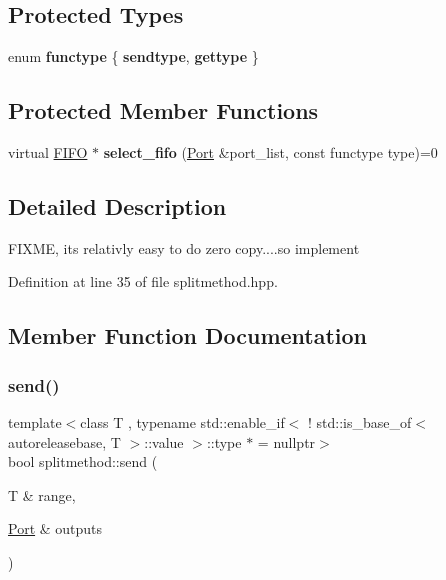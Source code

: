 \subsection*{Protected Types}
\begin{DoxyCompactItemize}
\item 
\hypertarget{classsplitmethod_a55be00e14bebb5a2df32666ca46a1592}{}\label{classsplitmethod_a55be00e14bebb5a2df32666ca46a1592} 
enum {\bfseries functype} \{ {\bfseries sendtype}, 
{\bfseries gettype}
 \}
\end{DoxyCompactItemize}
\subsection*{Protected Member Functions}
\begin{DoxyCompactItemize}
\item 
\hypertarget{classsplitmethod_af9abd140d6baab12921bbd6bc397b514}{}\label{classsplitmethod_af9abd140d6baab12921bbd6bc397b514} 
virtual \hyperlink{class_f_i_f_o}{F\+I\+FO} $\ast$ {\bfseries select\+\_\+fifo} (\hyperlink{class_port}{Port} \&port\+\_\+list, const functype type)=0
\end{DoxyCompactItemize}


\subsection{Detailed Description}
F\+I\+X\+ME, it\textquotesingle{}s relativly easy to do zero copy....so implement 

Definition at line 35 of file splitmethod.\+hpp.



\subsection{Member Function Documentation}
\hypertarget{classsplitmethod_af9067e627d58d344cd1b11bc9d3e92d6}{}\label{classsplitmethod_af9067e627d58d344cd1b11bc9d3e92d6} 
\subsubsection{\texorpdfstring{send()}{send()}}
{\footnotesize\ttfamily template$<$class T , typename std\+::enable\+\_\+if$<$ ! std\+::is\+\_\+base\+\_\+of$<$ autoreleasebase, T $>$\+::value $>$\+::type $\ast$  = nullptr$>$ \\
bool splitmethod\+::send (\begin{DoxyParamCaption}\item[{T \&}]{range,  }\item[{\hyperlink{class_port}{Port} \&}]{outputs }\end{DoxyParamCaption})\hspace{0.3cm}{\ttfamily [inline]}}

